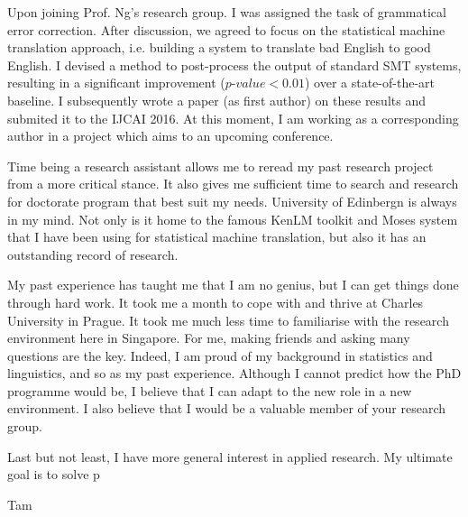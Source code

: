 \documentclass[a4paper, 12pt]{scrartcl}
\begin{document}
Upon joining Prof. Ng's research group. I was assigned the task of grammatical error correction.
After discussion, we agreed to focus on the statistical machine translation approach, i.e. building a system to translate bad English to good English. 
I devised a method to post-process the output of standard SMT systems, resulting in a significant improvement ($p\mbox{-}value < 0.01$) over a state-of-the-art baseline. 
I subsequently wrote a paper (as first author) on these results and submited it to the IJCAI 2016. 
At this moment, I am working as a corresponding author in a project which aims to an upcoming conference.

Time being a research assistant allows me to reread my past research project from a more critical stance. It also gives me sufficient time to search and research for doctorate program that best suit my needs.
University of Edinbergn is always in my mind. Not only is it home to the famous KenLM toolkit and Moses system that I have been using for statistical machine translation, but also it has an outstanding record of research.

My past experience has taught me that I am no genius, but I can get things done through hard work.
It took me a month to cope with and thrive at Charles University in Prague.
It took me much less time to familiarise with the research environment here in Singapore.
For me, making friends and asking many questions are the key.
Indeed, I am proud of my background in statistics and linguistics, and so as my past experience. 
Although I cannot predict how the PhD programme would be, I believe that I can adapt to the new role in a new environment. 
I also believe that I would be a valuable member of your research group.

Last but not least, I have more general interest in applied research. 
My ultimate goal is to solve p

Tam
\end{document}
